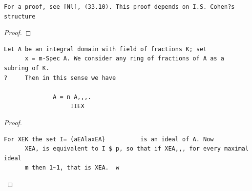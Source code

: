 \begin{theorem}
\begin{verbatim}
For a proof, see [Nl], (33.10). This proof depends on I.S. Cohen?s structure
\end{verbatim}
\end{theorem}
\begin{proof}
\notready
\end{proof}


\begin{theorem}\label{mcrt-auto-theorem-4-7}\uses{}
\begin{verbatim}
Let A be an integral domain with field of fractions K; set
      x = m-Spec A. We consider any ring of fractions of A as a subring of K.
?     Then in this sense we have

              A = n A,,,.
                   IIEX
\end{verbatim}
\end{theorem}
\begin{proof}
\begin{verbatim}
For XEK the set I= (aEAlaxEA}          is an ideal of A. Now
      XEA, is equivalent to I $ p, so that if XEA,,, for every maximal ideal
      m then 1~1, that is XEA.  w
\end{verbatim}
\end{proof}


